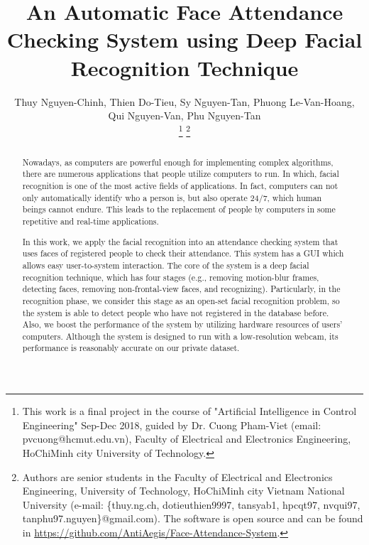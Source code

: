 \documentclass[journal, twocolumn]{IEEEtran}
\begin{document}
\title{An Automatic Face Attendance Checking System using Deep Facial Recognition Technique}


\author{Thuy Nguyen-Chinh,
		Thien Do-Tieu,
		Sy Nguyen-Tan,
		Phuong Le-Van-Hoang,
		Qui Nguyen-Van,
		Phu Nguyen-Tan

\thanks{This work is a final project in the course of "Artificial Intelligence in Control Engineering" Sep-Dec 2018, guided by Dr. Cuong Pham-Viet (email: pvcuong@hcmut.edu.vn), Faculty of Electrical and Electronics Engineering, HoChiMinh city University of Technology.}
\thanks{Authors are senior students in the Faculty of Electrical and Electronics Engineering, University of Technology, HoChiMinh city Vietnam National University (e-mail: \{thuy.ng.ch, dotieuthien9997, tansyab1, hpcqt97, nvqui97, tanphu97.nguyen\}@gmail.com). The software is open source and can be found in \url{https://github.com/AntiAegis/Face-Attendance-System}.}
}


\maketitle


\begin{abstract}
Nowadays, as computers are powerful enough for implementing complex algorithms, there are numerous applications that people utilize computers to run. In which, facial recognition is one of the most active fields of applications. In fact, computers can not only automatically identify who a person is, but also operate 24/7, which human beings cannot endure. This leads to the replacement of people by computers in some repetitive and real-time applications.

In this work, we apply the facial recognition into an attendance checking system that uses faces of registered people to check their attendance. This system has a GUI which allows easy user-to-system interaction. The core of the system is a deep facial recognition technique, which has four stages (e.g., removing motion-blur frames, detecting faces, removing non-frontal-view faces, and recognizing). Particularly, in the recognition phase, we consider this stage as an open-set facial recognition problem, so the system is able to detect people who have not registered in the database before. Also, we boost the performance of the system by utilizing hardware resources of users' computers. Although the system is designed to run with a low-resolution webcam, its performance is reasonably accurate on our private dataset.
\end{abstract}
\end{document}
